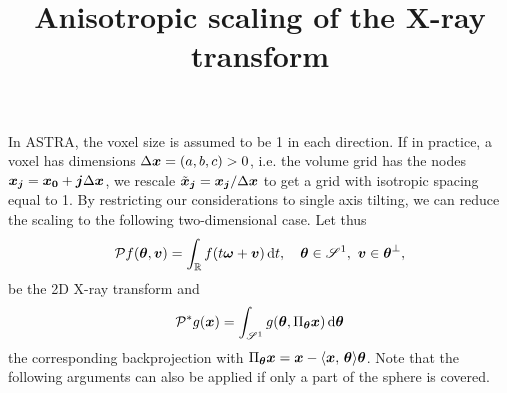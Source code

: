 \documentclass{amsart}
\title{Anisotropic scaling of the X-ray transform}
\begin{document}
In ASTRA, the voxel size is assumed to be 1 in each direction. If in practice, a voxel has dimensions $\Delta {\boldsymbol{x}} = (a, b, c) > 0$, i.e. 
the volume grid has the nodes ${\boldsymbol{x}}_{\boldsymbol{j}} = {\boldsymbol{x}}_{\boldsymbol{0}} + {\boldsymbol{j}} \Delta {\boldsymbol{x}}$, we rescale $\tilde {{\boldsymbol{x}}}_{\boldsymbol{j}} = {\boldsymbol{x}}_{\boldsymbol{j}} / \Delta {\boldsymbol{x}}$ to get a grid 
with isotropic spacing equal to 1. By restricting our considerations to single axis tilting, we can reduce the scaling to the following 
two-dimensional case. Let thus
%
\begin{equation*}
 {\ensuremath{\mathcal{P}}} f({\boldsymbol{\theta}}, {\boldsymbol{v}}) = \int_{\mathbb{R}} f(t{\boldsymbol{\omega}} + {\boldsymbol{v}})\, \mathrm{d} t,\quad {\boldsymbol{\theta}} \in \mathscr{S}^1,\ {\boldsymbol{v}} \in {\boldsymbol{\theta}}^\perp,
\end{equation*}
%
be the 2D X-ray transform and
%
\begin{equation*}
 {\ensuremath{\mathcal{P}}}^* g({\boldsymbol{x}}) = \int_{\mathscr{S}^1} g({\boldsymbol{\theta}}, \Pi_{\boldsymbol{\theta}} {\boldsymbol{x}})\, \mathrm{d} {\boldsymbol{\theta}}
\end{equation*}
%
the corresponding backprojection with $\Pi_{\boldsymbol{\theta}} {\boldsymbol{x}} = {\boldsymbol{x}} - \langle {\boldsymbol{x}},\,{\boldsymbol{\theta}}\rangle{\boldsymbol{\theta}}$. Note that the following arguments can also be 
applied if only a part of the sphere is covered.
\end{document}
